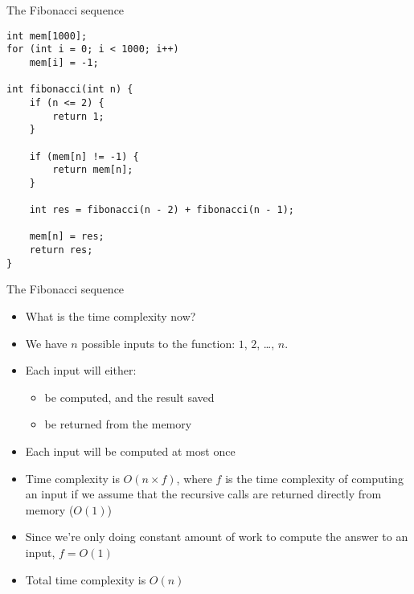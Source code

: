\documentclass[12pt,t]{beamer}
\newcommand{\bi}{\begin{itemize}}
\newcommand{\ei}{\end{itemize}}
\begin{document}
\begin{frame}[fragile]{The Fibonacci sequence}
    \vspace{5pt}

    \begin{verbatim}
int mem[1000];
for (int i = 0; i < 1000; i++)
    mem[i] = -1;

int fibonacci(int n) {
    if (n <= 2) {
        return 1;
    }

    if (mem[n] != -1) {
        return mem[n];
    }

    int res = fibonacci(n - 2) + fibonacci(n - 1);

    mem[n] = res;
    return res;
}
    \end{verbatim}

\end{frame}

\begin{frame}{The Fibonacci sequence}
    \bi
        \item What is the time complexity now?
        \vspace{5pt}
        \item We have $n$ possible inputs to the function: $1$, $2$, \ldots, $n$.
        \item Each input will either:
            \bi
                \item be computed, and the result saved
                \item be returned from the memory
            \ei
        \item Each input will be computed at most once
        \item Time complexity is $O(n \times f)$, where $f$ is the time complexity of computing an input if we assume that the recursive calls are returned directly from memory ($O(1)$)
        \item Since we're only doing constant amount of work to compute the answer to an input, $f = O(1)$
        \item Total time complexity is $O(n)$
    \ei
\end{frame}
\end{document}
